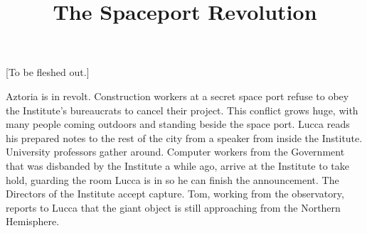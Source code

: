\documentclass[11pt]{article}
\begin{document}
\ttfamily
\title{The Spaceport Revolution}
\maketitle



[To be fleshed out.]

Aztoria is in revolt. 
Construction workers at a secret space port refuse to obey the Institute's bureaucrats to cancel their project.
This conflict grows huge, with many people coming outdoors and standing beside the space port.
Lucca reads his prepared notes to the rest of the city from a speaker from inside the Institute.
University professors gather around.
Computer workers from the Government that was disbanded by the Institute a while ago, arrive at the Institute to take hold, guarding the room Lucca is in so he can finish the announcement.
The Directors of the Institute accept capture.
Tom, working from the observatory, reports to Lucca that the giant object is still approaching from the Northern Hemisphere. 

\ 

\ 
\end{document}
